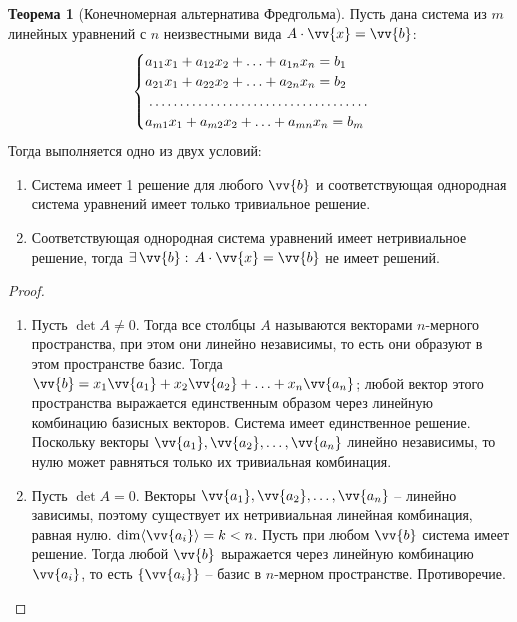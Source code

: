 \documentclass[12pt]{article}
\theoremstyle{definition}
\newtheorem{theorem}{Теорема}[section]
\begin{document}
\begin{theorem}[Конечномерная альтернатива Фредгольма]
    Пусть дана система из $m$ линейных уравнений с $n$ неизвестными вида $A\cdot \vv{x}=\vv{b}$:
    $$\begin{cases}
        a_{11}x_1 + a_{12}x_2 + \ldots + a_{1n}x_n = b_1\\
        a_{21}x_1 + a_{22}x_2 + \ldots + a_{2n}x_n = b_2\\
        \makebox[57mm]{\dotfill}\\
        a_{m1}x_1 + a_{m2}x_2 + \ldots + a_{mn}x_n = b_m
    \end{cases}$$
    Тогда выполняется одно из двух условий:
    \begin{center}
        \begin{multicols}{2}
            \begin{enumerate}
                \item Система имеет 1 решение для любого $\vv{b}$ и соответствующая однородная система уравнений имеет только тривиальное решение.
                \item Соответствующая однородная система уравнений имеет нетривиальное решение, тогда $\exists\,\vv{b}:\,A\cdot\vv{x}=\vv{b}$ не имеет решений.
            \end{enumerate}
        \end{multicols}
    \end{center}
\end{theorem}
\begin{proof}
    $ $\par\nobreak\ignorespaces
    \begin{enumerate}
        \item Пусть $\det A\neq0$. Тогда все столбцы $A$ называются векторами $n$-мерного пространства, при этом они линейно независимы, то есть они образуют в этом пространстве базис. Тогда $\vv{b}=x_1\vv{a_1}+x_2\vv{a_2}+\ldots+x_n\vv{a_n}$; любой вектор этого пространства выражается единственным образом через линейную комбинацию базисных векторов. Система имеет единственное решение. Поскольку векторы $\vv{a_1},\vv{a_2},\ldots,\vv{a_n}$ линейно независимы, то нулю может равняться только их тривиальная комбинация.
        \item Пусть $\det A=0$. Векторы $\vv{a_1},\vv{a_2},\ldots,\vv{a_n}$ – линейно зависимы, поэтому существует их нетривиальная линейная комбинация, равная нулю. $\dim \langle \vv{a_i} \rangle=k<n$. Пусть при любом $\vv{b}$ система имеет решение. Тогда любой $\vv{b}$ выражается через линейную комбинацию $\vv{a_i}$, то есть $\{\vv{a_i}\}$ – базис в $n$-мерном пространстве. Противоречие.
    \end{enumerate}
\end{proof}
\end{document}
